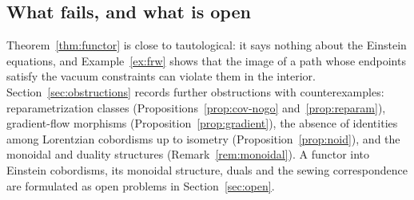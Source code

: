 \documentclass[11pt,a4paper,reqno]{amsart}
\theoremstyle{definition}
\numberwithin{equation}{section}
\begin{document}
\subsection*{What fails, and what is open}
Theorem~\ref{thm:functor} is close to tautological: it says nothing about the Einstein equations, and Example~\ref{ex:frw} shows that the image of a path whose endpoints satisfy the vacuum constraints can violate them in the interior. Section~\ref{sec:obstructions} records further obstructions with counterexamples: reparametrization classes (Propositions~\ref{prop:cov-nogo} and~\ref{prop:reparam}), gradient-flow morphisms (Proposition~\ref{prop:gradient}), the absence of identities among Lorentzian cobordisms up to isometry (Proposition~\ref{prop:noid}), and the monoidal and duality structures (Remark~\ref{rem:monoidal}). A functor into Einstein cobordisms, its monoidal structure, duals and the sewing correspondence are formulated as open problems in Section~\ref{sec:open}.
\end{document}
